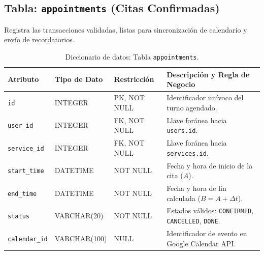 \documentclass[12pt,a4paper]{report}
\begin{document}
\subsection{Tabla: \texttt{appointments} (Citas Confirmadas)}
Registra las transacciones validadas, listas para sincronización de calendario y envío de recordatorios.
\begin{table}[h!]
\centering
\small
\begin{tabularx}{\textwidth}{|p{2.6cm}|p{2.9cm}|p{2.4cm}|X|}
\hline
\rowcolor{BrandPrimary!20}
\textbf{Atributo} & \textbf{Tipo de Dato} & \textbf{Restricción} & \textbf{Descripción y Regla de Negocio} \\
\hline
\texttt{id} & INTEGER & PK, NOT NULL & Identificador unívoco del turno agendado. \\
\hline
\texttt{user\_id} & INTEGER & FK, NOT NULL & Llave foránea hacia \texttt{users.id}. \\
\hline
\texttt{service\_id} & INTEGER & FK, NOT NULL & Llave foránea hacia \texttt{services.id}. \\
\hline
\texttt{start\_time} & DATETIME & NOT NULL & Fecha y hora de inicio de la cita ($A$). \\
\hline
\texttt{end\_time} & DATETIME & NOT NULL & Fecha y hora de fin calculada ($B = A + \Delta t$). \\
\hline
\texttt{status} & VARCHAR(20) & NOT NULL & Estados válidos: \texttt{CONFIRMED}, \texttt{CANCELLED}, \texttt{DONE}. \\
\hline
\texttt{calendar\_id}& VARCHAR(100) & NULL & Identificador de evento en Google Calendar API. \\
\hline
\end{tabularx}
\caption{Diccionario de datos: Tabla \texttt{appointments}.}
\label{tab:dic_appointments}
\end{table}
\end{document}
